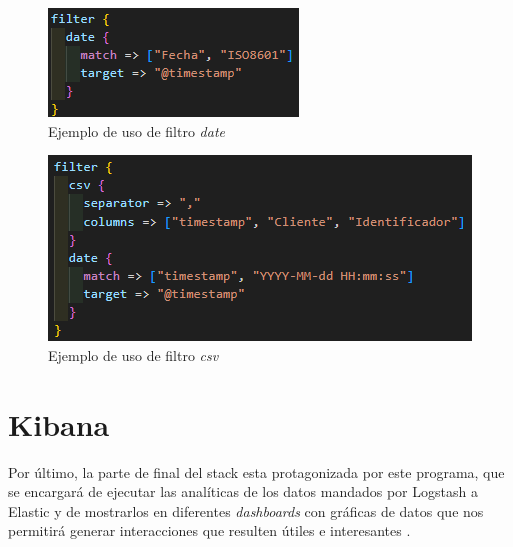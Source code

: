 \begin{figure}
    \centering
    \includegraphics[width=1\linewidth]{img/date.png}
    \caption{Ejemplo de uso de filtro \textit{date}}
    \label{fig:date}
\end{figure}

\begin{figure}
    \centering
    \includegraphics[width=1\linewidth]{img/csv.png}
    \caption{Ejemplo de uso de filtro \textit{csv}}
    \label{fig:csv}
\end{figure}

\paragraph{    }
\paragraph{  }
\paragraph{  }

\section{Kibana}
Por último, la parte de final del stack esta protagonizada por este programa, que se encargará de ejecutar las analíticas de los datos mandados por Logstash a Elastic y de mostrarlos en diferentes \textit{dashboards} con gráficas de datos que nos permitirá generar interacciones que resulten útiles e interesantes \cite{Kibana}.

